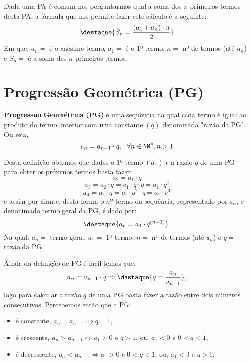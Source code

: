  Dada uma PA é comum nos perguntarmos qual a soma dos $n$ primeiros termos desta PA, a fórmula que nos permite fazer este cálculo é a seguinte:
 \[\destaque{S_n= \frac{(a_1 + a_n)\cdot n}{2}}\]
 Em que: $a_n=$ é o enésimo termo, $a_1=$ é o 1º termo, $n=$ nº de termos (até $a_n$) e $S_n=$ é a soma dos $n$ primeiros termos.



\section{Progressão Geométrica (PG)}

 \colorbox{azul}{
 \begin{minipage}{0.9\linewidth}
 \begin{center}
  \textbf{Progressão Geométrica (PG)} é uma sequência na qual cada termo é igual ao produto do termo anterior com uma constante $(q)$ denominada "razão da PG". Ou seja,
  \[a_{n}= a_{n-1} \cdot q, \ \ \forall n \in \N^{\ast}, n > 1\]
 \end{center}
 \end{minipage}}
 \vskip0.3cm

 Desta definição obtemos que dados o 1ª termo $(a_1)$ e a razão $q$ de uma PG para obter os próximos termos basta fazer:
 \[a_2= a_1 \cdot q\]
 \[a_3= a_2 \cdot q= a_1 \cdot q \cdot q= a_1 \cdot q^2\]
 \[a_4= a_3 \cdot q= a_1 \cdot q^2 \cdot q= a_1 \cdot q^3 \]
 e assim por diante, desta forma o $nº$ termo da sequência, representado por $a_n$, e denonimado termo geral da PG, é dado por:
 \[\destaque{a_n= a_1 \cdot q^{(n-1)}} .\]
 Na qual: $a_n=$ termo geral, $a_1=$ 1º termo, $n=$ nº de termos (até $a_n$) e $q=$ razão da PG.

 Ainda da definição de PG é fácil temos que:
 \[a_{n}= a_{n-1} \cdot q \Rightarrow
 \destaque{q= \frac{a_{n}}{ a_{n-1}}} ,\]
 logo para calcular a razão $q$ de uma PG basta fazer a razão entre dois números consecutivos. Percebemos então que a PG:
 \begin{itemize}
  \item é constante, $a_n= a_{n-1} \Leftrightarrow q= 1$,
  \item é crescente, $a_n > a_{n-1} \Leftrightarrow a_1 > 0$ e $q > 1$, ou, $a_1 < 0$ e $0 < q < 1$,
  \item é decrescente, $a_n < a_{n-1} \Leftrightarrow a_1 > 0$ e $0 < q < 1$, ou, $a_1 < 0$ e $q > 1$.
 \end{itemize}

